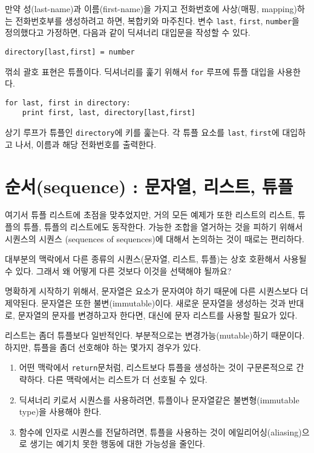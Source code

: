 만약 성(last-name)과 이름(first-name)을 가지고 전화번호에 사상(매핑, mapping)하는 전화번호부를 생성하려고 하면, 복합키와 마주친다.
변수 {\tt last}, {\tt first}, {\tt number}을 정의했다고 가정하면, 다음과 같이 딕셔너리 대입문을 작성할 수 있다.

\beforeverb
\begin{verbatim}
directory[last,first] = number
\end{verbatim}
\afterverb
%

꺾쇠 괄호 표현은 튜플이다. 
딕셔너리를 훑기 위해서 {\tt for} 루프에 튜플 대입을 사용한다.


\beforeverb
\begin{verbatim}
for last, first in directory:
    print first, last, directory[last,first]
\end{verbatim}
\afterverb
%

상기 루프가 튜플인 {\tt directory}에 키를 훑는다. 
각 튜플 요소를 {\tt last}, {\tt first}에 대입하고 나서, 이름과 해당 전화번호를 출력한다.

\section{순서(sequence) : 문자열, 리스트, 튜플}

여기서 튜플 리스트에 초점을 맞추었지만, 거의 모든 예제가 또한 리스트의 리스트, 튜플의 튜플, 튜플의 리스트에도 동작한다.
가능한 조합을 열거하는 것을 피하기 위해서 시퀀스의 시퀀스 (sequences of sequences)에 대해서 논의하는 것이 때로는 편리하다.

대부분의 맥락에서 다른 종류의 시퀀스(문자열, 리스트, 튜플)는 상호 호환해서 사용될 수 있다. 그래서 왜 어떻게 다른 것보다 이것을 선택해야 될까요?


명확하게 시작하기 위해서, 문자열은 요소가 문자여야 하기 때문에 다른 시퀀스보다 더 제약된다.
문자열은 또한 불변(immutable)이다. 새로운 문자열을 생성하는 것과 반대로, 문자열의 문자를 변경하고자 한다면, 대신에 문자 리스트를 사용할 필요가 있다.

리스트는 좀더 튜플보다 일반적인다. 부분적으로는 변경가능(mutable)하기 때문이다.
하지만, 튜플을 좀더 선호해야 하는 몇가지 경우가 있다.

\begin{enumerate}

\item 어떤 맥락에서 {\tt return}문처럼, 리스트보다 튜플을 생성하는 것이 구문론적으로 간략하다.
다른 맥락에서는 리스트가 더 선호될 수 있다.

\item 딕셔너리 키로서 시퀀스를 사용하려면, 튜플이나 문자열같은 불변형(immutable type)을 사용해야 한다.

\item 함수에 인자로 시퀀스를 전달하려면, 튜플을 사용하는 것이 에일리어싱(aliasing)으로 생기는 예기치 못한 행동에 대한 가능성을 줄인다.

\end{enumerate}

